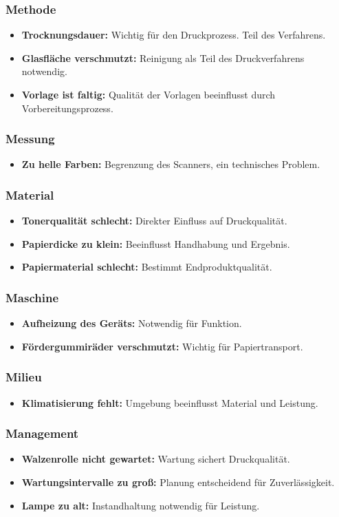 \documentclass[12pt]{article}
\begin{document}
\subsubsection*{Methode}
\begin{itemize}
	\item \textbf{Trocknungsdauer:} Wichtig für den Druckprozess. Teil des Verfahrens.
	\item \textbf{Glasfläche verschmutzt:} Reinigung als Teil des Druckverfahrens notwendig.
	\item \textbf{Vorlage ist faltig:} Qualität der Vorlagen beeinflusst durch Vorbereitungsprozess.
\end{itemize}

\subsubsection*{Messung}
\begin{itemize}
	\item \textbf{Zu helle Farben:} Begrenzung des Scanners, ein technisches Problem.
\end{itemize}

\subsubsection*{Material}
\begin{itemize}
	\item \textbf{Tonerqualität schlecht:} Direkter Einfluss auf Druckqualität.
	\item \textbf{Papierdicke zu klein:} Beeinflusst Handhabung und Ergebnis.
	\item \textbf{Papiermaterial schlecht:} Bestimmt Endproduktqualität.
\end{itemize}

\subsubsection*{Maschine}
\begin{itemize}
	\item \textbf{Aufheizung des Geräts:} Notwendig für Funktion.
	\item \textbf{Fördergummiräder verschmutzt:} Wichtig für Papiertransport.
\end{itemize}

\subsubsection*{Milieu}
\begin{itemize}
	\item \textbf{Klimatisierung fehlt:} Umgebung beeinflusst Material und Leistung.
\end{itemize}

\subsubsection*{Management}
\begin{itemize}
	\item \textbf{Walzenrolle nicht gewartet:} Wartung sichert Druckqualität.
	\item \textbf{Wartungsintervalle zu groß:} Planung entscheidend für Zuverlässigkeit.
	\item \textbf{Lampe zu alt:} Instandhaltung notwendig für Leistung.
\end{itemize}
\end{document}
